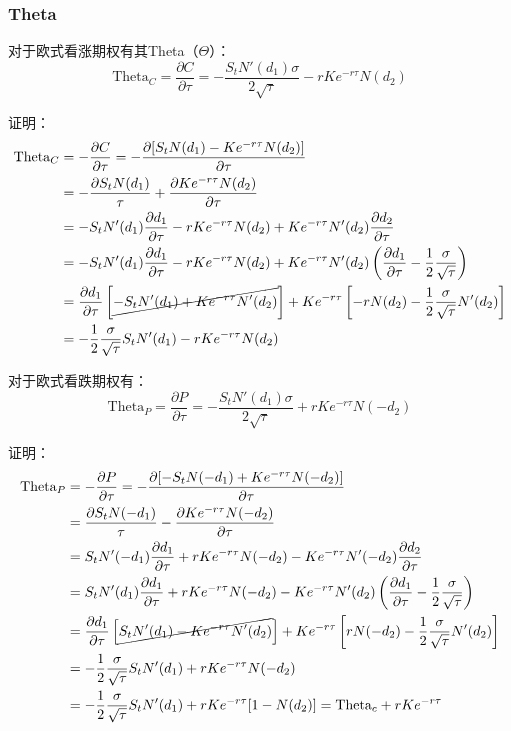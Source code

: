 \documentclass[11pt]{article}
\begin{document}
\subsubsection{Theta}

对于欧式看涨期权有其Theta（$\Theta$）：
\begin{equation*}
    \text{Theta}_C = \frac{\partial C}{\partial \tau} = -\frac{S_t N'(d_1)\sigma}{2\sqrt{\tau}} - r K e^{-r\tau}N(d_2)
\end{equation*}

证明：
\begin{align*}
    \text{Theta}_C &= -\frac{\partial C}{\partial \tau} = - \frac{\partial [S_t N(d_1) - Ke^{-r\tau} N(d_2)]}{\partial \tau} \\ 
    &= -\frac{\partial S_t N(d_1)}{\tau} + \frac{\partial Ke^{-r\tau} N(d_2)}{\partial \tau} \\ 
    &= -S_t N'(d_1)\frac{\partial d_1}{\partial \tau} - rKe^{-r\tau}N(d_2) + Ke^{-r\tau} N'(d_2)\frac{\partial d_2}{\partial \tau} \\
    &= -S_t N'(d_1)\frac{\partial d_1}{\partial \tau} - rKe^{-r\tau} N(d_2) + Ke^{-r\tau}N'(d_2)\left(\frac{\partial d_1}{\partial \tau} -\frac{1}{2}\frac{\sigma}{\sqrt{\tau}} \right) \\
    &= \frac{\partial d_1}{\partial \tau} \left[\cancel{-S_t N'(d_1) + Ke^{-r\tau} N'(d_2) } \right] + Ke^{-r\tau} \left[ -rN(d_2) -\frac{1}{2}\frac{\sigma}{\sqrt{\tau}} N'(d_2)\right] \\
    &=  -\frac{1}{2}\frac{\sigma}{\sqrt{\tau}}S_t N'(d_1) - rKe^{-r\tau} N(d_2)
\end{align*}

对于欧式看跌期权有：
\begin{equation*}
    \text{Theta}_P = \frac{\partial P}{\partial \tau} = -\frac{S_t N'(d_1)\sigma}{2\sqrt{\tau}} + r K e^{-r\tau}N(-d_2)
\end{equation*}

证明：
\begin{align*}
    \text{Theta}_P &= -\frac{\partial P}{\partial \tau} = - \frac{\partial [-S_t N(-d_1) + Ke^{-r\tau} N(-d_2)]}{\partial \tau} \\ 
    &= \frac{\partial S_t N(-d_1)}{\tau} - \frac{\partial Ke^{-r\tau} N(-d_2)}{\partial \tau} \\ 
    &= S_t N'(-d_1)\frac{\partial d_1}{\partial \tau} + rKe^{-r\tau}N(-d_2) - Ke^{-r\tau} N'(-d_2)\frac{\partial d_2}{\partial \tau} \\
    &= S_t N'(d_1)\frac{\partial d_1}{\partial \tau} + r Ke^{-r\tau} N(-d_2) - Ke^{-r\tau}N'(d_2)\left(\frac{\partial d_1}{\partial \tau} -\frac{1}{2}\frac{\sigma}{\sqrt{\tau}} \right) \\
    &= \frac{\partial d_1}{\partial \tau} \left[\cancel{S_t N'(d_1) - Ke^{-r\tau} N'(d_2) } \right] + Ke^{-r\tau} \left[ rN(-d_2) -\frac{1}{2}\frac{\sigma}{\sqrt{\tau}} N'(d_2)\right] \\
    &=  -\frac{1}{2}\frac{\sigma}{\sqrt{\tau}}S_t N'(d_1) + rKe^{-r\tau} N(-d_2) \\
    &=  -\frac{1}{2}\frac{\sigma}{\sqrt{\tau}}S_t N'(d_1) + rKe^{-r\tau}[1- N(d_2) ] = \text{Theta}_c + rKe^{-r\tau}
\end{align*}
\end{document}
